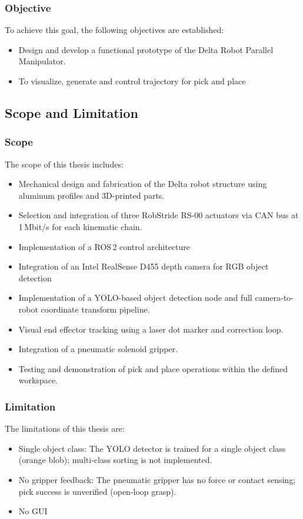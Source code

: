 \subsubsection{Objective}
\hspace{1.27cm}
To achieve this goal, the following objectives are established:
\begin{itemize}
    \item Design and develop a functional prototype of the Delta Robot Parallel Manipulator.
    \item To visualize, generate and control trajectory for pick and place
\end{itemize}

\subsection{Scope and Limitation}
\subsubsection{Scope}
\hspace{1.27cm}
The scope of this thesis includes:
\begin{itemize}
    \item Mechanical design and fabrication of the Delta robot structure using aluminum profiles and 3D-printed parts.
    \item Selection and integration of three RobStride RS-00 actuators via CAN bus at 1\,Mbit/s for each kinematic chain.
    \item Implementation of a ROS\,2 control architecture
    \item Integration of an Intel RealSense D455 depth camera for RGB object detection
    \item Implementation of a YOLO-based object detection node and full camera-to-robot coordinate transform pipeline.
    \item Visual end effector tracking using a laser dot marker and correction loop.
    \item Integration of a pneumatic solenoid gripper.
    \item Testing and demonstration of pick and place operations within the defined workspace.
\end{itemize}

\subsubsection{Limitation}
\hspace{1.27cm}
The limitations of this thesis are:
\begin{itemize}
    \item Single object class: The YOLO detector is trained for a single object class (orange blob); multi-class sorting is not implemented.
    \item No gripper feedback: The pneumatic gripper has no force or contact sensing; pick success is unverified (open-loop grasp).
    \item No GUI 
\end{itemize}
